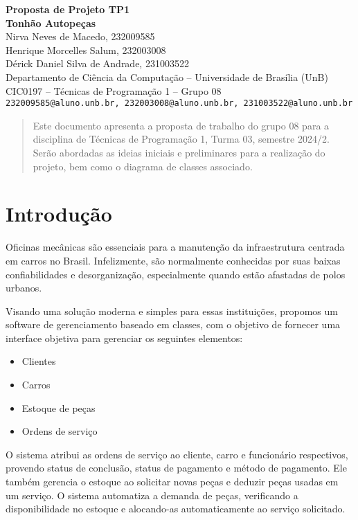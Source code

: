 \documentclass[a4paper,12pt]{article}
\begin{document}
\begin{center}
  \textbf{\Huge Proposta de Projeto TP1\\ Tonhão Autopeças} \\[0.5em]
  Nirva Neves de Macedo, 232009585\\
  Henrique Morcelles Salum, 232003008\\
  Dérick Daniel Silva de Andrade, 231003522\\[0.5em]
  Departamento de Ciência da Computação – Universidade de Brasília (UnB)\\
  CIC0197 – Técnicas de Programação 1 – Grupo 08\\
  \texttt{232009585@aluno.unb.br, 232003008@aluno.unb.br, 231003522@aluno.unb.br}
\end{center}

\begin{abstract}
Este documento apresenta a proposta de trabalho do grupo 08 para a disciplina de Técnicas de Programação 1, Turma 03, semestre 2024/2. Serão abordadas as ideias iniciais e preliminares para a realização do projeto, bem como o diagrama de classes associado.
\end{abstract}

\section{Introdução}

Oficinas mecânicas são essenciais para a manutenção da infraestrutura centrada em carros no Brasil. Infelizmente, são normalmente conhecidas por suas baixas confiabilidades e desorganização, especialmente quando estão afastadas de polos urbanos.

Visando uma solução moderna e simples para essas instituições, propomos um software de gerenciamento baseado em classes, com o objetivo de fornecer uma interface objetiva para gerenciar os seguintes elementos:

\begin{itemize}[noitemsep]
    \item Clientes
    \item Carros
    \item Estoque de peças
    \item Ordens de serviço
\end{itemize}

O sistema atribui as ordens de serviço ao cliente, carro e funcionário respectivos, provendo status de conclusão, status de pagamento e método de pagamento. Ele também gerencia o estoque ao solicitar novas peças e deduzir peças usadas em um serviço. O sistema automatiza a demanda de peças, verificando a disponibilidade no estoque e alocando-as automaticamente ao serviço solicitado.
\end{document}

